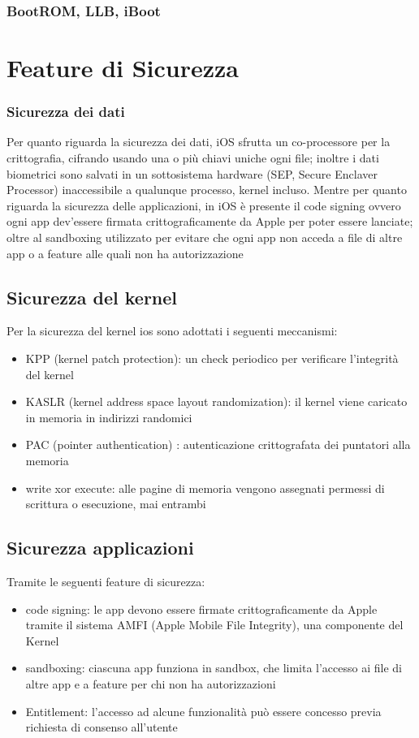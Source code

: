 \documentclass{report}
\begin{document}
\subsubsection{BootROM, LLB, iBoot}
\section{Feature di Sicurezza}
\subsubsection{Sicurezza dei dati}
Per quanto riguarda la sicurezza dei dati, iOS sfrutta un co-processore per la crittografia, cifrando usando una o più chiavi uniche ogni file; inoltre i dati biometrici sono salvati in un sottosistema hardware (SEP, Secure Enclaver Processor) inaccessibile a qualunque processo, kernel incluso. Mentre per quanto riguarda la sicurezza delle applicazioni, in iOS è presente il code signing ovvero ogni app dev’essere firmata crittograficamente da Apple per poter essere lanciate; oltre al sandboxing utilizzato per evitare che ogni app non acceda a file di altre app o a feature alle quali non ha autorizzazione
\subsection{Sicurezza del kernel}
Per la sicurezza del kernel ios sono adottati i seguenti meccanismi:
\begin{itemize}
    \item KPP (kernel patch protection): un check periodico per verificare l’integrità del kernel
    \item KASLR (kernel address space layout randomization): il kernel viene caricato in memoria in indirizzi randomici
    \item PAC (pointer authentication) : autenticazione crittografata dei puntatori alla memoria
    \item write xor execute: alle pagine di memoria vengono assegnati permessi di scrittura o esecuzione, mai entrambi
\end{itemize}
\subsection{Sicurezza applicazioni}
Tramite le seguenti feature di sicurezza:
\begin{itemize}
    \item code signing: le app devono essere firmate crittograficamente da Apple tramite il sistema AMFI (Apple Mobile File Integrity), una componente del Kernel
    \item sandboxing: ciascuna app funziona in sandbox, che limita l’accesso ai file di altre app e a
    feature per chi non ha autorizzazioni
    \item Entitlement: l’accesso ad alcune funzionalità può essere concesso previa richiesta di
    consenso all’utente
\end{itemize}
\end{document}
